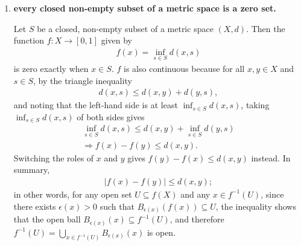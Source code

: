 \documentclass[a4paper,12pt]{article}
\begin{document}
\begin{enumerate}
\begin{enumerate}
            \item
                \boldmath\textbf{every closed non-empty subset of a metric space is a zero set.
                }\unboldmath \par
                Let $S$ be a closed, non-empty subset of a metric space $(X, d)$. Then the function $f : X \to [0, 1]$ given by
                \begin{align*}
                    f(x) = \inf_{s \in S} d(x, s)
                \end{align*}
                is zero exactly when $x \in S$. $f$ is also continuous because for all $x, y \in X$ and $s \in S$, by the triangle inequality
                \begin{align*}
                    d(x, s) \leq d(x, y) + d(y, s),
                \end{align*}
                and noting that the left-hand side is at least $\inf_{s \in S} d(x, s)$, taking $\inf_{s \in S} d(x, s)$ of both sides gives
                \begin{gather*}
                    \inf_{s \in S} d(x, s) \leq d(x, y) + \inf_{s \in S} d(y, s) \\
                    \Rightarrow f(x) - f(y) \leq d(x, y).
                \end{gather*}
                Switching the roles of $x$ and $y$ gives $f(y) - f(x) \leq d(x, y)$ instead. In summary,
                \begin{gather*}
                    |f(x) - f(y)| \leq d(x, y);
                \end{gather*}
                in other words, for any open set $U \subseteq f(X)$ and any $x \in f^{-1}(U)$, since there exists $\epsilon(x) > 0$ such that $B_{\epsilon(x)}(f(x)) \subseteq U$, the inequality shows that the open ball $B_{\epsilon(x)}(x) \subseteq f^{-1}(U)$, and therefore $f^{-1}(U) = \bigcup_{x \in f^{-1}(U)} B_{\epsilon(x)}(x)$ is open.


\end{enumerate}
\end{enumerate}
\end{document}
